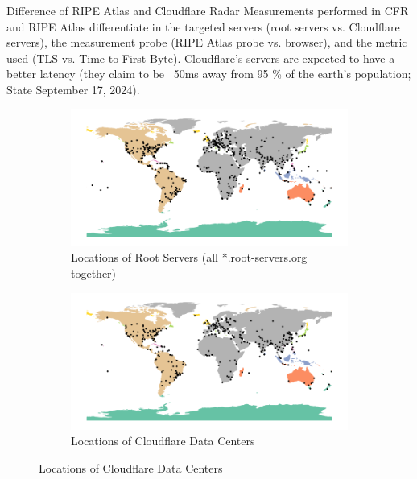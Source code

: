 \begin{takeaway}{Difference of RIPE Atlas and Cloudflare Radar}
	Measurements performed in \ac{CFR} and RIPE Atlas differentiate in the
	targeted servers (root servers vs. Cloudflare servers), the measurement
	probe (RIPE Atlas probe vs. browser), and the metric used (TLS vs. Time
	to First Byte). Cloudflare's servers are expected to have a better
	latency (they claim to be ~50ms away from 95 \% of the earth's
	population; State September 17, 2024).
\end{takeaway}

\begin{figure}
	\begin{subfigure}[t]{0.48\textwidth}
		\includegraphics[width=\textwidth]{./chapters/3-methodology/img/rootserver-locations.png}
		\caption{Locations of Root Servers (all *.root-servers.org
			together) \cite{rootservers092024}}
	\end{subfigure}
	\begin{subfigure}[t]{0.48\textwidth}
		\includegraphics[width=\textwidth]{./chapters/3-methodology/img/cloudflare-datacenter-locations.png}
		\caption{Locations of Cloudflare Data Centers
			\cite{CloudflareGlobalNetwork2024}}
	\end{subfigure}
\end{figure}

